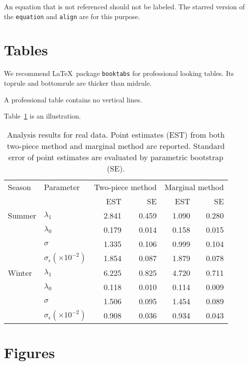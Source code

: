 \documentclass[letterpaper, inpress]{jds} %
\begin{document}
An equation that is not referenced should not be labeled. The starred
version of the \texttt{equation} and \texttt{align} are for this purpose.

\section{Tables}%
\label{sec:tabs}

We recommend \LaTeX\ package \texttt{booktabs} for professional
looking tables. Its toprule and bottomrule are thicker than midrule.

A professional table contains no vertical lines.

Table~\ref{tab:realdata} is an illustration.
\begin{table}[tbp]
  \caption{Analysis results for real data. Point
    estimates (EST) from both two-piece method and marginal method are
    reported. Standard error of point estimates are evaluated by
    parametric bootstrap (SE).}%
  \label{tab:realdata}
  \centering
  \begin{tabular}{llrrrr}
    \toprule
    \multicolumn{1}{l}{Season} & \multicolumn{1}{l}{Parameter}
    & \multicolumn{2}{c}{Two-piece method} & \multicolumn{2}{c}{Marginal method} \\
    \cmidrule(r){3-4} \cmidrule(r){5-6}
                               & & EST & SE & EST & SE \\
    \midrule
    Summer & $\lambda_1$ & 2.841 & 0.459 & 1.090 & 0.280 \\
   & $\lambda_0$ & 0.179 & 0.014 & 0.158 & 0.015 \\
   & $\sigma$ & 1.335 & 0.106 & 0.999 & 0.104 \\
   & $\sigma_\epsilon (\times 10^{-2})$ & 1.854 & 0.087 & 1.879 & 0.078 \\
  Winter & $\lambda_1$ & 6.225 & 0.825 & 4.720 & 0.711 \\
   & $\lambda_0$ & 0.118 & 0.010 & 0.114 & 0.009 \\
   & $\sigma$ & 1.506 & 0.095 & 1.454 & 0.089 \\
   & $\sigma_\epsilon (\times 10^{-2})$ & 0.908 & 0.036 & 0.934 & 0.043 \\
    \bottomrule
  \end{tabular}
\end{table}




\section{Figures}%
\label{sec:figs}
\end{document}
